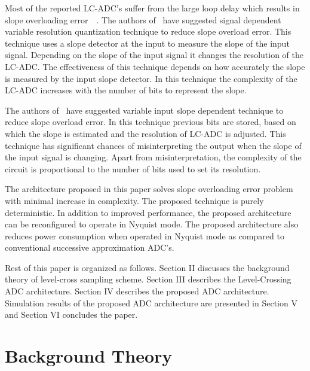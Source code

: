 \documentclass[conference]{IEEEtran}
\begin{document}
	Most of the reported \mbox{LC-ADC's} suffer from the large loop delay which results in slope overloading error~\cite{trakimas2011adaptive}~\cite{agarwal2009adaptive}. The authors of~\cite{kurchuk2009signal} have suggested signal dependent variable resolution quantization technique to reduce slope overload error. This technique uses a slope detector at the input to measure the slope of the input signal. Depending on the slope of the input signal it changes the resolution of the \mbox{LC-ADC}. The effectiveness of this technique depends on how accurately the slope is measured by the input slope detector. In this technique the complexity of the \mbox{LC-ADC} increases with the number of bits to represent the slope.\par


	The authors of~\cite{agarwal2009adaptive} have suggested variable input slope dependent technique to reduce slope overload error. In this technique previous bits are stored, based on which the slope is estimated and the resolution of \mbox{LC-ADC} is adjusted. This technique has significant chances of misinterpreting the output when the slope of the input signal is changing. Apart from misinterpretation, the complexity of the circuit is proportional to the number of bits used to set its resolution. \par


	The architecture proposed in this paper solves slope overloading error problem with minimal increase in complexity. The proposed technique is purely deterministic. In addition to improved performance, the proposed architecture can be reconfigured to operate in Nyquist mode. The proposed architecture also reduces power consumption when operated in Nyquist mode as compared to conventional successive approximation \mbox{ADC's}.\par


	Rest of this paper is organized as follows. Section II discusses the background theory of level-cross sampling scheme. Section III describes the Level-Crossing ADC architecture. Section IV describes the proposed ADC architecture. Simulation results of the proposed ADC architecture are presented in Section V and Section VI concludes the paper.\par







\section{Background Theory}
	 
\end{document}

